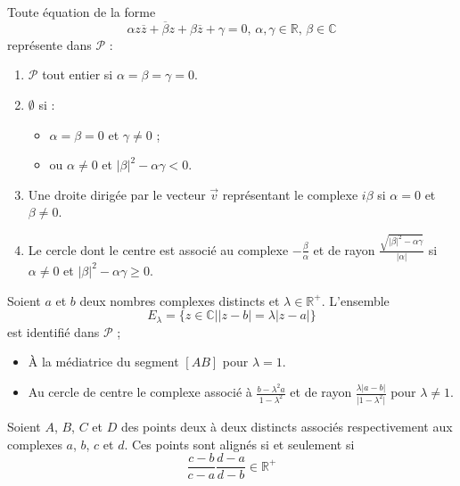   \begin{theorem}
    Toute équation de la forme
    \[ \alpha z \overline{z} + \overline{\beta} z + \beta \overline{z} + \gamma = 0, \, \alpha, \gamma \in \mathbb{R}, \, \beta \in \mathbb{C} \]
    représente dans $\mathcal{P}$ :
    \begin{enumerate}[label=(\roman*)]
      \item $\mathcal{P}$ tout entier si $\alpha = \beta = \gamma = 0$.
      \item $\emptyset$ si :
      \begin{itemize}
        \item $\alpha = \beta = 0$ et $\gamma \neq 0$ ;
        \item ou $\alpha \neq 0$ et $\vert \beta \vert^2 - \alpha \gamma < 0$.
      \end{itemize}
      \item Une droite dirigée par le vecteur $\overrightarrow{v}$ représentant le complexe $i\beta$ si $\alpha = 0$ et $\beta \neq 0$.
      \item Le cercle dont le centre est associé au complexe $-\frac{\beta}{\alpha}$ et de rayon $\frac{\sqrt{\vert \beta \vert^2 - \alpha \gamma}}{\vert \alpha \vert}$ si $\alpha \neq 0$ et $\vert \beta \vert^2 - \alpha \gamma \geq 0$.
    \end{enumerate}
  \end{theorem}

  \begin{corollary}
    Soient $a$ et $b$ deux nombres complexes distincts et $\lambda \in \mathbb{R}^+$. L'ensemble
    \[ E_\lambda = \{ z \in \mathbb{C} \mid \vert z - b \vert = \lambda \vert z - a \vert \} \]
    est identifié dans $\mathcal{P}$ ;
    \begin{itemize}
      \item À la médiatrice du segment $[AB]$ pour $\lambda = 1$.
      \item Au cercle de centre le complexe associé à $\frac{b-\lambda^2 a}{1 - \lambda^2}$ et de rayon $\frac{\lambda \vert a - b \vert}{\vert 1 - \lambda^2 \vert}$ pour $\lambda \neq 1$.
    \end{itemize}
  \end{corollary}

  \begin{theorem}
    Soient $A$, $B$, $C$ et $D$ des points deux à deux distincts associés respectivement aux complexes $a$, $b$, $c$ et $d$. Ces points sont alignés si et seulement si
    \[ \frac{c-b}{c-a} \frac{d-a}{d-b} \in \mathbb{R}^+ \]
  \end{theorem}

